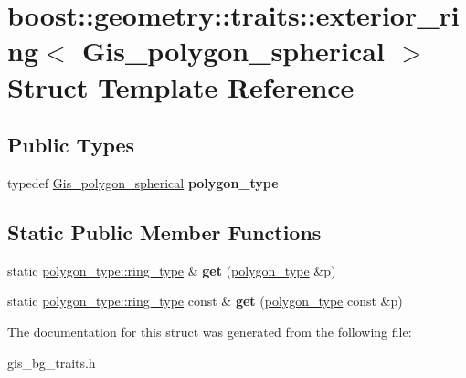 \hypertarget{structboost_1_1geometry_1_1traits_1_1exterior__ring_3_01Gis__polygon__spherical_01_4}{}\section{boost\+:\+:geometry\+:\+:traits\+:\+:exterior\+\_\+ring$<$ Gis\+\_\+polygon\+\_\+spherical $>$ Struct Template Reference}
\label{structboost_1_1geometry_1_1traits_1_1exterior__ring_3_01Gis__polygon__spherical_01_4}
\subsection*{Public Types}
\begin{DoxyCompactItemize}
\item 
\mbox{\label{structboost_1_1geometry_1_1traits_1_1exterior__ring_3_01Gis__polygon__spherical_01_4_aae4ca41e65517e45061f38197924d82e}} 
typedef \mbox{\hyperlink{classGis__polygon__spherical}{Gis\+\_\+polygon\+\_\+spherical}} {\bfseries polygon\+\_\+type}
\end{DoxyCompactItemize}
\subsection*{Static Public Member Functions}
\begin{DoxyCompactItemize}
\item 
\mbox{\label{structboost_1_1geometry_1_1traits_1_1exterior__ring_3_01Gis__polygon__spherical_01_4_a5048d5c6100e0153d403fb4a0c2ce7c7}} 
static \mbox{\hyperlink{classGis__polygon__ring__spherical}{polygon\+\_\+type\+::ring\+\_\+type}} \& {\bfseries get} (\mbox{\hyperlink{classGis__polygon__spherical}{polygon\+\_\+type}} \&p)
\item 
\mbox{\label{structboost_1_1geometry_1_1traits_1_1exterior__ring_3_01Gis__polygon__spherical_01_4_a17ef178f791f1a2ed3c8c798df5acd6c}} 
static \mbox{\hyperlink{classGis__polygon__ring__spherical}{polygon\+\_\+type\+::ring\+\_\+type}} const  \& {\bfseries get} (\mbox{\hyperlink{classGis__polygon__spherical}{polygon\+\_\+type}} const \&p)
\end{DoxyCompactItemize}


The documentation for this struct was generated from the following file\+:\begin{DoxyCompactItemize}
\item 
gis\+\_\+bg\+\_\+traits.\+h\end{DoxyCompactItemize}
